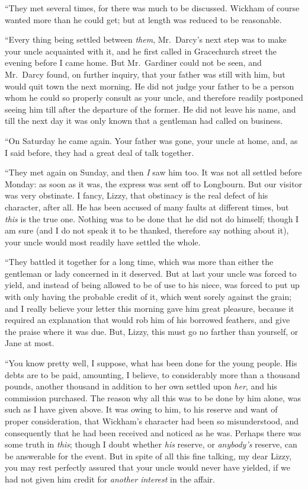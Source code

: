 ``They met several times, for there was much to be discussed.
Wickham of course wanted more than he could get; but at length
was reduced to be reasonable.

``Every thing being settled between \emph{them}, Mr.\ Darcy's next step was to
make your uncle acquainted with it, and he first called in Gracechurch
street the evening before I came home.  But Mr.\ Gardiner could not be
seen, and Mr.\ Darcy found, on further inquiry, that your father was
still with him, but would quit town the next morning.  He did not
judge your father to be a person whom he could so properly consult as
your uncle, and therefore readily postponed seeing him till after the
departure of the former.  He did not leave his name, and till the next
day it was only known that a gentleman had called on business.

``On Saturday he came again.  Your father was gone, your uncle at home,
and, as I said before, they had a great deal of talk together.

``They met again on Sunday, and then \emph{I} saw him too.  It was not all
settled before Monday: as soon as it was, the express was sent off to
Longbourn.  But our visitor was very obstinate.  I fancy, Lizzy, that
obstinacy is the real defect of his character, after all.  He has been
accused of many faults at different times, but \emph{this} is the true one.
Nothing was to be done that he did not do himself; though I am sure
(and I do not speak it to be thanked, therefore say nothing about it),
your uncle would most readily have settled the whole.

``They battled it together for a long time, which was more than either
the gentleman or lady concerned in it deserved.  But at last your
uncle was forced to yield, and instead of being allowed to be of use
to his niece, was forced to put up with only having the probable
credit of it, which went sorely against the grain; and I really
believe your letter this morning gave him great pleasure, because it
required an explanation that would rob him of his borrowed feathers,
and give the praise where it was due.  But, Lizzy, this must go no
farther than yourself, or Jane at most.

``You know pretty well, I suppose, what has been done for the young
people.  His debts are to be paid, amounting, I believe, to
considerably more than a thousand pounds, another thousand in addition
to her own settled upon \emph{her}, and his commission purchased.  The reason
why all this was to be done by him alone, was such as I have given
above.  It was owing to him, to his reserve and want of proper
consideration, that Wickham's character had been so misunderstood, and
consequently that he had been received and noticed as he was.  Perhaps
there was some truth in \emph{this}; though I doubt whether \emph{his} reserve, or
\emph{anybody's} reserve, can be answerable for the event.  But in spite of
all this fine talking, my dear Lizzy, you may rest perfectly assured
that your uncle would never have yielded, if we had not given him
credit for \emph{another interest} in the affair.

